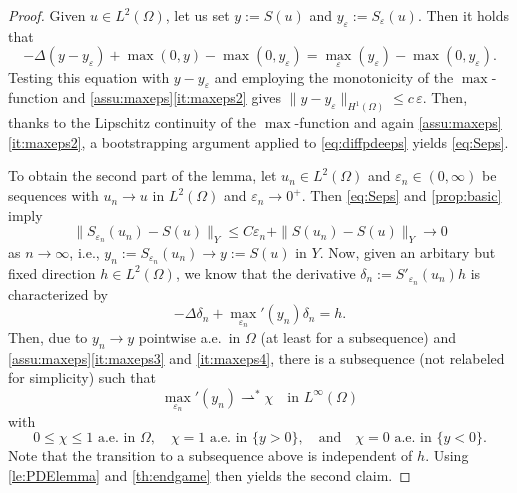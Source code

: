 \documentclass[reqno]{shinyart}
\begin{document}
\begin{proof}
    Given  $u \in L^2(\Omega)$, let us set $y:= S(u)$ and $y_\varepsilon := S_\varepsilon(u)$. 
    Then it holds that
    \begin{equation}\label{eq:diffpdeeps}
        -\Delta ( y - y_\varepsilon) +  \max(0, y) -  \max(0, y_\varepsilon)  
        = {\max\nolimits}_\varepsilon(y_\varepsilon) - \max(0, y_\varepsilon).
    \end{equation}
    Testing this equation with $y - y_\varepsilon$ and employing the monotonicity of 
    the $\max$-function and \cref{assu:maxeps}\ref{it:maxeps2} gives
    $\|y-y_\varepsilon\|_{H^1(\Omega)} \leq c\,\varepsilon$. Then, 
    thanks to the Lipschitz continuity of the $\max$-function and again 
    \cref{assu:maxeps}\ref{it:maxeps2}, a bootstrapping 
    argument applied to \eqref{eq:diffpdeeps} yields \eqref{eq:Seps}.

    To obtain the second part of the lemma, 
    let $u_n \in L^2(\Omega)$ and $\varepsilon_n \in (0, \infty)$ be sequences with 
    $u_n \to u$ in $L^2(\Omega)$ and $\varepsilon_n \to 0^+$. 
    Then \eqref{eq:Seps} and \cref{prop:basic} imply
    \begin{equation*}
        \|S_{\varepsilon_n}(u_n) - S(u)\|_{Y} \leq C  \varepsilon_n + \|S(u_n) - S(u)\|_{Y} \to 0  
    \end{equation*}
    as $n \to \infty$, i.e., $y_n := S_{\varepsilon_n}(u_n) \to y:= S(u)$ in $Y$. 
    Now, given an arbitary but fixed direction $h \in L^2(\Omega)$, 
    we know that the derivative $\delta_n := S'_{\varepsilon_{n}}(u_{n})h$ is characterized by 
    \begin{equation*}
        - \Delta \delta_n + {\max\nolimits}_{\varepsilon_n}'(y_n)\delta_n = h. 
    \end{equation*}
    Then, due to $y_n \to y$ pointwise a.e.\ in $\Omega$ (at least for a subsequence) and 
    \cref{assu:maxeps}\ref{it:maxeps3} and \ref{it:maxeps4}, there is 
    a subsequence (not relabeled for simplicity) such that 
    \begin{equation*}
        {\max\nolimits}_{\varepsilon_n}'(y_n) {\rightharpoonup}^{*} \chi \quad \text{in } L^\infty(\Omega)
    \end{equation*}
    with 
    \begin{equation*}
        0 \leq \chi \leq 1 \text{ a.e.\ in }\Omega, \quad \chi = 1 \text{ a.e.\ in } \{y > 0\},
        \quad \text{and}  \quad \chi = 0 \text{ a.e.\ in } \{y < 0\}. 
    \end{equation*}
    Note that the transition to a subsequence above is independent of $h$.
    Using \cref{le:PDElemma} and \cref{th:endgame} then yields the second claim.
\end{proof}
\end{document}
